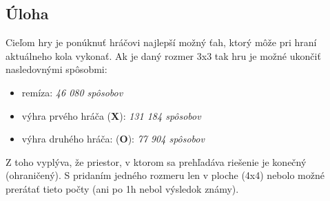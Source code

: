 \subsection{Úloha}\label{subsec:task}

Cieľom hry je ponúknuť hráčovi najlepší možný ťah, ktorý môže pri hraní aktuálneho kola vykonať.
Ak je daný rozmer 3x3 tak hru je možné ukončiť nasledovnými spôsobmi:\cite{number_of_wins}
\begin{itemize}
    \item remíza: \emph{46 080 spôsobov}
    \item výhra prvého hráča (\textbf{X}): \emph{131 184 spôsobov}
    \item výhra druhého hráča: (\textbf{O}): \emph{77 904 spôsobov}
\end{itemize}

Z toho vyplýva, že priestor, v ktorom sa prehľadáva riešenie je konečný (ohraničený).
S pridaním jedného rozmeru len v ploche (4x4) nebolo možné prerátať tieto počty (ani po 1h nebol výsledok známy).

